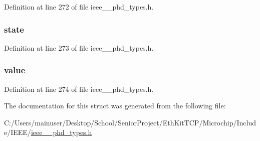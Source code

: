 Definition at line 272 of file ieee\+\_\+\_\+phd\+\_\+types.\+h.

\hypertarget{struct___enum_obs_value_a13d01c3f9f21fd12a22772c0e1b7d88b}{}
\subsubsection[{state}]{ state}\label{struct___enum_obs_value_a13d01c3f9f21fd12a22772c0e1b7d88b}


Definition at line 273 of file ieee\+\_\+\_\+phd\+\_\+types.\+h.

\hypertarget{struct___enum_obs_value_a17a0b71604d0c12551d17fc067dc361c}{}
\subsubsection[{value}]{ value}\label{struct___enum_obs_value_a17a0b71604d0c12551d17fc067dc361c}


Definition at line 274 of file ieee\+\_\+\_\+phd\+\_\+types.\+h.



The documentation for this struct was generated from the following file\+:\begin{DoxyCompactItemize}
\item 
C\+:/\+Users/mainuser/\+Desktop/\+School/\+Senior\+Project/\+Eth\+Kit\+T\+C\+P/\+Microchip/\+Include/\+I\+E\+E\+E/\hyperlink{ieee__11073__phd__types_8h}{ieee\+\_\+\_\+phd\+\_\+types.\+h}\end{DoxyCompactItemize}
